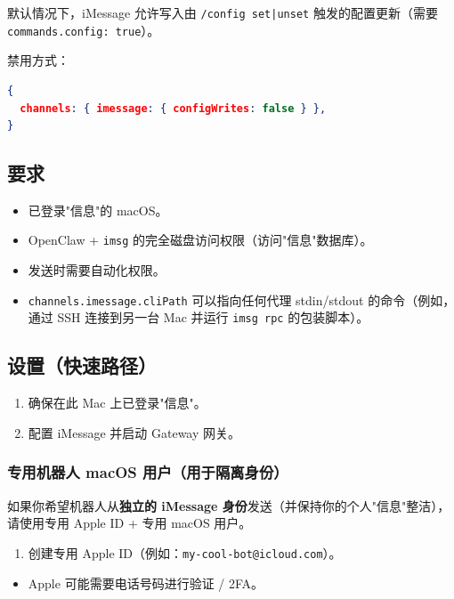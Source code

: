 默认情况下，iMessage 允许写入由 \texttt{/config set|unset} 触发的配置更新（需要 \texttt{commands.config: true}）。

禁用方式：

\begin{lstlisting}[language=json]
{
  channels: { imessage: { configWrites: false } },
}
\end{lstlisting}


\subsection{要求}


\begin{itemize}
  \item 已登录"信息"的 macOS。
  \item OpenClaw + \texttt{imsg} 的完全磁盘访问权限（访问"信息"数据库）。
  \item 发送时需要自动化权限。
  \item \texttt{channels.imessage.cliPath} 可以指向任何代理 stdin/stdout 的命令（例如，通过 SSH 连接到另一台 Mac 并运行 \texttt{imsg rpc} 的包装脚本）。
\end{itemize}


\subsection{设置（快速路径）}


\begin{enumerate}
  \item 确保在此 Mac 上已登录"信息"。
  \item 配置 iMessage 并启动 Gateway 网关。
\end{enumerate}


\subsubsection{专用机器人 macOS 用户（用于隔离身份）}


如果你希望机器人从\textbf{独立的 iMessage 身份}发送（并保持你的个人"信息"整洁），请使用专用 Apple ID + 专用 macOS 用户。

\begin{enumerate}
  \item 创建专用 Apple ID（例如：\texttt{my-cool-bot@icloud.com}）。
\end{enumerate}

\begin{itemize}
  \item Apple 可能需要电话号码进行验证 / 2FA。
\end{itemize}


